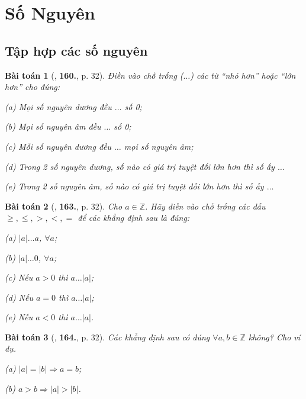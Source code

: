 \documentclass{article}
\numberwithin{equation}{section}
\newtheorem{baitoan}{Bài toán}[section]
\begin{document}

\section{Số Nguyên}

\subsection{Tập hợp các số nguyên}
\begin{baitoan}[\cite{Binh_Toan_6_tap_1}, \textbf{160.}, p. 32]
	Điền vào chỗ trống ($\ldots$) các từ ``nhỏ hơn'' hoặc ``lớn hơn'' cho đúng:
	\begin{enumerate*}
		\item[(a)] Mọi số nguyên dương đều $\ldots$ số 0;
		\item[(b)] Mọi số nguyên âm đều $\ldots$ số 0;
		\item[(c)] Mỗi số nguyên dương đều $\ldots$ mọi số nguyên âm;
		\item[(d)] Trong 2 số nguyên dương, số nào có giá trị tuyệt đối lớn hơn thì số ấy $\ldots$
		\item[(e)] Trong 2 số nguyên âm, số nào có giá trị tuyệt đối lớn hơn thì số ấy $\ldots$
	\end{enumerate*}
\end{baitoan}

\begin{baitoan}[\cite{Binh_Toan_6_tap_1}, \textbf{163.}, p. 32]
	Cho $a\in\mathbb{Z}$. Hãy điền vào chỗ trống các dấu $\ge,\le,>,<,=$ để các khẳng định sau là đúng:
	\begin{enumerate*}
		\item[(a)] $|a|\ldots a$, $\forall a$;
		\item[(b)] $|a|\ldots 0$, $\forall a$;
		\item[(c)] Nếu $a > 0$ thì $a\ldots|a|$;
		\item[(d)] Nếu $a = 0$ thì $a\ldots|a|$;
		\item[(e)] Nếu $a < 0$ thì $a\ldots|a|$.
	\end{enumerate*}
\end{baitoan}

\begin{baitoan}[\cite{Binh_Toan_6_tap_1}, \textbf{164.}, p. 32]
	Các khẳng định sau có đúng $\forall a,b\in\mathbb{Z}$ không? Cho ví dụ.
	\begin{enumerate*}
		\item[(a)] $|a| = |b|\Rightarrow a = b$;
		\item[(b)] $a > b\Rightarrow|a| > |b|$.
	\end{enumerate*}
\end{baitoan}
\end{document}
